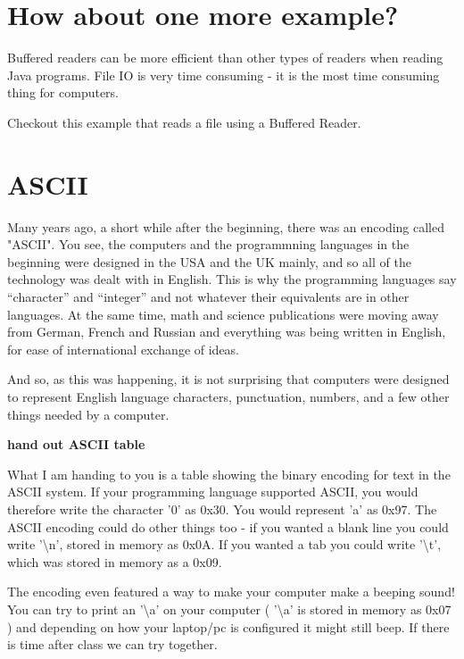 \documentclass[12pt]{article}
\begin{document}
\section{How about one more example?}
Buffered readers can be more efficient than other types of readers when reading
Java programs. File IO is very time consuming - it is the most time consuming
thing for computers. 


Checkout this example that reads a file using a Buffered Reader.

 
\section{ASCII}
Many years ago, a short while after the beginning, there was an encoding called "ASCII". You see, the computers and the programmning languages in the beginning were designed in the USA and the UK mainly, and so all of the technology was dealt with in English. This is why the programming languages say ``character'' and ``integer'' and not whatever their equivalents are in other languages. At the same time, math and science publications were moving away from German, French and Russian and everything was being written in English, for ease of international exchange of ideas. 

And so, as this was happening, it is not surprising that computers were designed to represent English language characters, punctuation, numbers, and a few other things needed by a computer. 

\begin{center}
\textbf{hand out ASCII table}
\end{center}

What I am handing to you is a table showing the binary encoding for text in the ASCII system. If your programming language supported ASCII, you would therefore write the character '0' as 0x30. You would represent 'a' as 0x97. The ASCII encoding could do other things too - if you wanted a blank line you could write '\textbackslash n', stored in memory as 0x0A. If you wanted a tab you could write '\textbackslash t', which was stored in memory as a 0x09.

The encoding even featured a way to make your computer make a beeping sound! You can try to print an '\textbackslash a' on your computer ( '\textbackslash a' is stored in memory as 0x07 ) and depending on how your laptop/pc is configured it might still beep. If there is time after class we can try together.
\end{document}
